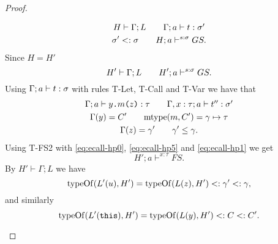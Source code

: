 \begin{proof}
\begin{description}
\begin{description}
          \begin{equation} \label{eq:ecall-hp0}
            \begin{gathered}
              H \vdash \Gamma; L \quad\quad \mbox{$\Gamma;a\vdash t:\sigma'$} \\
              \sigma' <: \sigma \quad\quad H; a \vdash^{s:\sigma} GS.
            \end{gathered}
          \end{equation}
          Since $H = H'$
          \begin{equation} \label{eq:ecall-hp5}
            H' \vdash \Gamma;L \quad\quad H'; a \vdash^{s: \sigma} GS.
          \end{equation}
          Using $\mbox{$\Gamma;a\vdash t:\sigma$}$ with rules {\sc T-Let, T-Call} and
          {\sc T-Var} we have that
          \begin{equation} \label{eq:ecall-hp1}
            \begin{gathered}
              \mbox{$\Gamma;a\vdash\mbox{\mdseries$y$\texttt{.}$m$\texttt{(}$z$\texttt{)}}:\tau$} \quad\quad \mbox{$\Gamma,
              x: \tau;a\vdash t'':\sigma'$} \\
              \Gamma(y) = C' \quad\quad \mbox{$\mathrm{mtype}$}(m, C') = \gamma \mapsto \tau \\
              \Gamma(z) = \gamma' \quad\quad \gamma' \leq \gamma.
            \end{gathered}
          \end{equation}
          Using {\sc T-FS2} with \eqref{eq:ecall-hp0}, \eqref{eq:ecall-hp5} and
          \eqref{eq:ecall-hp1} we get 
          \begin{equation} \label{eq:ecall-hp6}
            H';a \vdash^{x: \tau} FS.
          \end{equation}
          By $H' \vdash \Gamma;L$ we have
          \begin{equation} \label{eq:ecall-hp2}
            \mbox{$\mathrm{typeOf}$}(L'(u), H') = \mbox{$\mathrm{typeOf}$}(L(z), H') <: \gamma' <: \gamma,
          \end{equation}
          and similarly
          \begin{equation} \label{eq:ecall-hp3}
            \mbox{$\mathrm{typeOf}$}(L'(\mbox{\mdseries\texttt{this}}), H') = \mbox{$\mathrm{typeOf}$}(L(y), H') <: C <: C'.
          \end{equation}


\end{description}
\end{description}
\end{proof}
